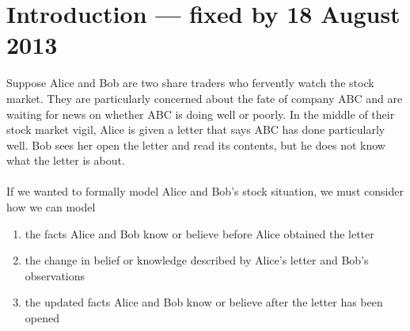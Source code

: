 \section{Introduction --- fixed by 18 August 2013}

% 
% 
% 

Suppose Alice and Bob are two share traders who fervently watch the stock market. They
are particularly concerned about the fate of company ABC and are waiting for news on whether ABC is
doing well or poorly. In the middle of their stock market vigil, Alice is given a letter that says
ABC has done particularly well. Bob sees her open the letter and read its contents, but he does not
know what the letter is about.\\
\\
If we wanted to formally model Alice and Bob's stock situation, we must consider how we can model
\begin{enumerate}
	\item the facts Alice and Bob know or believe before Alice obtained the letter
	\item the change in belief or knowledge described by Alice's letter and Bob's observations
	\item the updated facts Alice and Bob know or believe after the letter has been opened
\end{enumerate}

